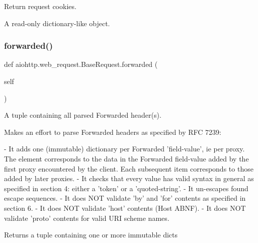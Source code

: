 \begin{DoxyVerb}Return request cookies.

A read-only dictionary-like object.
\end{DoxyVerb}
 \mbox{\label{classaiohttp_1_1web__request_1_1_base_request_a566f25e300cdd3a93cfee31a583ae106}} 
\subsubsection{\texorpdfstring{forwarded()}{forwarded()}}
{\footnotesize\ttfamily def aiohttp.\+web\+\_\+request.\+Base\+Request.\+forwarded (\begin{DoxyParamCaption}\item[{}]{self }\end{DoxyParamCaption})}

\begin{DoxyVerb}A tuple containing all parsed Forwarded header(s).

Makes an effort to parse Forwarded headers as specified by RFC 7239:

- It adds one (immutable) dictionary per Forwarded 'field-value', ie
  per proxy. The element corresponds to the data in the Forwarded
  field-value added by the first proxy encountered by the client. Each
  subsequent item corresponds to those added by later proxies.
- It checks that every value has valid syntax in general as specified
  in section 4: either a 'token' or a 'quoted-string'.
- It un-escapes found escape sequences.
- It does NOT validate 'by' and 'for' contents as specified in section
  6.
- It does NOT validate 'host' contents (Host ABNF).
- It does NOT validate 'proto' contents for valid URI scheme names.

Returns a tuple containing one or more immutable dicts
\end{DoxyVerb}
 \mbox{\label{classaiohttp_1_1web__request_1_1_base_request_a47e9e408916e78c890244c91133885f4}} 
